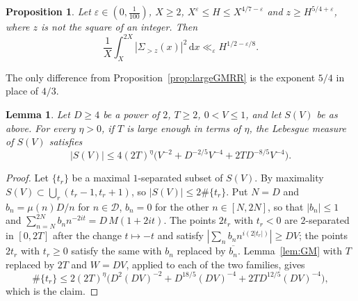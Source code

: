 \documentclass[11pt]{amsart}
\newtheorem{proposition}[theorem]{Proposition}
\newtheorem{lemma}[theorem]{Lemma}
\theoremstyle{remark}
\newcommand{\eps}{\varepsilon}
\newcommand{\dd}{\,\mathrm{d}}
\begin{document}
\begin{proposition}\label{prop:large}
Let $\eps\in(0,\frac1{100})$, $X\ge 2$, $X^\eps\le H\le X^{4/7-\eps}$ and
$z\ge H^{5/4+\eps}$, where $z$ is not the square of an integer.  Then
\[
  \frac1X\int_X^{2X}|\Sigma_{>z}(x)|^2\dd x\ll_\eps H^{1/2-\eps/8}.
\]
\end{proposition}

The only difference from Proposition~\ref{prop:largeGMRR} is the exponent $5/4$
in place of $4/3$.

\begin{lemma}\label{lem:levels}
Let $D\ge4$ be a power of $2$, $T\ge 2$, $0<V\le1$, and let $S(V)$ be as above.  For
every $\eta>0$, if $T$ is large enough in terms of $\eta$, the Lebesgue measure of
$S(V)$ satisfies
\[
  |S(V)|\le 4(2T)^{\eta}\bigl(V^{-2}+D^{-2/5}V^{-4}+2TD^{-8/5}V^{-4}\bigr).
\]
\end{lemma}

\begin{proof}
Let $\{t_r\}$ be a maximal $1$-separated subset of $S(V)$.  By maximality
$S(V)\subset\bigcup_r(t_r-1,t_r+1)$, so $|S(V)|\le 2\#\{t_r\}$.  Put $N=D$ and
$b_n=\mu(n)D/n$ for $n\in\mathcal D$, $b_n=0$ for the other $n\in[N,2N]$, so
that $|b_n|\le1$ and $\sum_{n=N}^{2N}b_nn^{-2it}=D\,M(1+2it)$.  The points
$2t_r$ with $t_r<0$ are $2$-separated in $[0,2T]$ after the change
$t\mapsto-t$ and satisfy $|\sum_n b_nn^{i(2|t_r|)}|\ge DV$; the points $2t_r$ with
$t_r\ge0$ satisfy the same with $b_n$ replaced by $\overline{b_n}$.  Lemma~\ref{lem:GM}
with $T$ replaced by $2T$ and $W=DV$, applied to each of the two families, gives
\[
  \#\{t_r\}\le 2(2T)^{\eta}\bigl(D^2(DV)^{-2}+D^{18/5}(DV)^{-4}+2TD^{12/5}(DV)^{-4}\bigr),
\]
which is the claim.
\end{proof}
\end{document}
